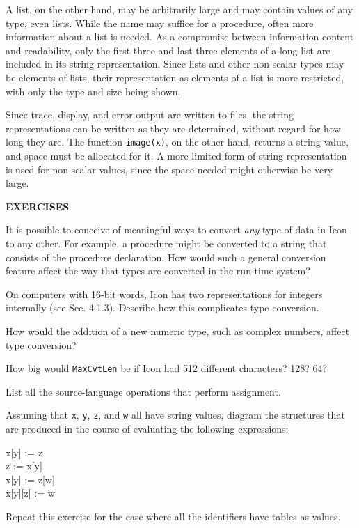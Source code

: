 A list, on the other hand, may be arbitrarily large and may contain
values of any type, even lists. While the name may suffice for a
procedure, often more information about a list is needed. As a
compromise between information content and readability, only the first
three and last three elements of a long list are included in its
string representation.  Since lists and other non-scalar types may be
elements of lists, their representation as elements of a list is more
restricted, with only the type and size being shown.

Since trace, display, and error output are written to files, the
string representations can be written as they are determined, without
regard for how long they are. The function \texttt{image(x)}, on the
other hand, returns a string value, and space must be allocated for
it. A more limited form of string representation is used for
non-scalar values, since the space needed might otherwise be very
large.

\bigskip

\noindent\textbf{EXERCISES}

 It is possible to conceive of meaningful ways to convert
\textit{any} type of data in Icon to any other. For example, a
procedure might be converted to a string that consists of the
procedure declaration. How would such a general conversion feature
affect the way that types are converted in the run-time system?

 On computers with 16-bit words, Icon has two
representations for integers internally (see Sec. 4.1.3). Describe how
this complicates type conversion.

 How would the addition of a new numeric type,
such as complex numbers, affect type conversion?

 How big would \texttt{MaxCvtLen} be if Icon had 512
different characters?  128? 64?

 List all the source-language operations that
perform assignment.

 Assuming that \texttt{x}, \texttt{y}, \texttt{z},
and \texttt{w} all have string values, diagram the structures that are
produced in the course of evaluating the following expressions:
\begin{iconcode}
x[y] := z\\
z := x[y]\\
x[y] := z[w]\\
x[y][z] := w
\end{iconcode}
Repeat this exercise for the case where all the identifiers have tables as values.


